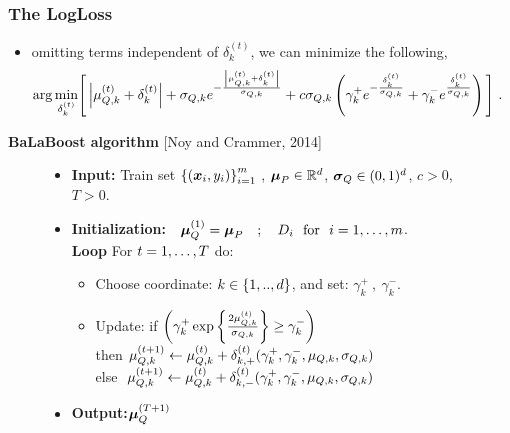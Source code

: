 \documentclass[mathserif]{beamer}
\begin{document}
\begin{frame}
\frametitle{ The LogLoss  }
\begin{itemize}
\vspace{-0.1cm}
\item omitting terms independent of $\delta_k ^{(t)}$, we can minimize the following,
\begin{align*}
\arg\min_{\delta_k^{(t)}}&\Bigg[ \left\vert{\mu_{Q,k}^{(t)} +\delta_k^{(t)}
  }\right\vert +\sigma_{Q,k} e^{-\frac{\left\vert{\mu_{Q,k}^{(t)} +\delta_k^{(t)}
      }\right\vert}{\sigma_{Q,k}}}   +c\sigma_{Q,k}\left({\gamma_k^{+}e^{-\frac{\delta_k ^{(t)}}{\sigma_{Q,k}}}+\gamma_k^{-}e^{\frac{\delta_k ^{(t)}}{\sigma_{Q,k}}}}\right)  \Bigg] ~.
\end{align*}
\end{itemize}

\begin{exampleblock}{\textbf{BaLaBoost algorithm}  [Noy and Crammer, 2014]}
\begin{figure}[!h!]
\begin{itemize}
\item {\bf Input:} {Train set $\left\{{({\boldsymbol{x}}_{i},y_{i})}\right\}_{i=1}^m$ ,
  ${\boldsymbol{\mu}}_P\in \mathbb{R}^d$, ${\boldsymbol{\sigma}}_Q\in(0,1)^d$, $c>0$, $T>0$.   }
\item {\bf Initialization:}$\quad{\boldsymbol{\mu}}_Q^{(1)} ={\boldsymbol{\mu}}_P \quad; \quad D_{i} ~~ \textrm {for     }~ i = 1 , \ldots , m$.\\
{\bf Loop} For $t = 1 , \ldots , T$ do:
\nolineskips
\begin{itemize}
\item Choose coordinate: $k\in \left\{{1,..,d}\right\}$,
and set: $\gamma_k^{+}~,~ \gamma_k^{-}$.
\item Update:
  if $\left({\gamma_k^{+}\exp{\left\{{{\frac{2\mu_{Q,k}^{(t)}  }{\sigma_{Q,k}}}}\right\}}\geq\gamma_k^{-}}\right)$
 \\then $\mu_{Q,k}^{(t+1)}\leftarrow \mu_{Q,k}^{(t)}+\delta^{(t)}_{k,+}(\gamma_k^{+},\gamma_k^{-},\mu_{Q,k},\sigma_{Q,k})$
 \\else $~\mu_{Q,k}^{(t+1)}\leftarrow \mu_{Q,k}^{(t)}+\delta^{(t)}_{k,-}(\gamma_k^{+},\gamma_k^{-},\mu_{Q,k},\sigma_{Q,k})$
\end{itemize}
\item {\bf Output:}${\boldsymbol{\mu}}_Q^{(T+1)}$
\\
\end{itemize}
\end{figure}
 \end{exampleblock}
\end{frame}
\end{document}
